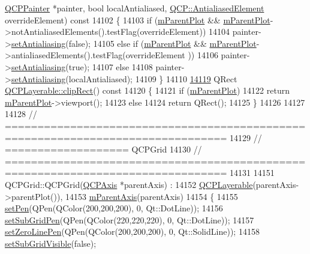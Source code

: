 \begin{DoxyCode}
      \hyperlink{a00047}{QCPPainter} *painter, \textcolor{keywordtype}{bool} localAntialiased, \hyperlink{a00143_ae55dbe315d41fe80f29ba88100843a0c}{QCP::AntialiasedElement} 
      overrideElement)\textcolor{keyword}{ const}
14102 \textcolor{keyword}{}\{
14103   \textcolor{keywordflow}{if} (\hyperlink{a00044_aa2a528433e44db02b8aef23c1f9f90ed}{mParentPlot} && \hyperlink{a00044_aa2a528433e44db02b8aef23c1f9f90ed}{mParentPlot}->notAntialiasedElements().testFlag(overrideElement))
14104     painter->\hyperlink{a00047_aaba1deb9188244d9ea65b035112b4d05}{setAntialiasing}(\textcolor{keyword}{false});
14105   \textcolor{keywordflow}{else} \textcolor{keywordflow}{if} (\hyperlink{a00044_aa2a528433e44db02b8aef23c1f9f90ed}{mParentPlot} && \hyperlink{a00044_aa2a528433e44db02b8aef23c1f9f90ed}{mParentPlot}->antialiasedElements().testFlag(overrideElement
      ))
14106     painter->\hyperlink{a00047_aaba1deb9188244d9ea65b035112b4d05}{setAntialiasing}(\textcolor{keyword}{true});
14107   \textcolor{keywordflow}{else}
14108     painter->\hyperlink{a00047_aaba1deb9188244d9ea65b035112b4d05}{setAntialiasing}(localAntialiased);
14109 \}
14110 
\hypertarget{a00115_source_l14119}{}\hyperlink{a00044_a07a8f746640c3704b09910df297afcba}{14119} QRect \hyperlink{a00044_a07a8f746640c3704b09910df297afcba}{QCPLayerable::clipRect}()\textcolor{keyword}{ const}
14120 \textcolor{keyword}{}\{
14121   \textcolor{keywordflow}{if} (\hyperlink{a00044_aa2a528433e44db02b8aef23c1f9f90ed}{mParentPlot})
14122     \textcolor{keywordflow}{return} \hyperlink{a00044_aa2a528433e44db02b8aef23c1f9f90ed}{mParentPlot}->viewport();
14123   \textcolor{keywordflow}{else}
14124     \textcolor{keywordflow}{return} QRect();
14125 \}
14126 
14127 
14128 \textcolor{comment}{// ================================================================================}
14129 \textcolor{comment}{// =================== QCPGrid}
14130 \textcolor{comment}{// ================================================================================}
14131 
14151 QCPGrid::QCPGrid(\hyperlink{a00025}{QCPAxis} *parentAxis) :
14152   \hyperlink{a00044}{QCPLayerable}(parentAxis->parentPlot()),
14153   \hyperlink{a00116_aea80007cf54320e192a69054cd81504b}{mParentAxis}(parentAxis)
14154 \{
14155   \hyperlink{a00116_a499165f4744b6d22da7b24295910fb2c}{setPen}(QPen(QColor(200,200,200), 0, Qt::DotLine));
14156   \hyperlink{a00116_a48c20da07dee569fc3acae82c9278fa7}{setSubGridPen}(QPen(QColor(220,220,220), 0, Qt::DotLine));
14157   \hyperlink{a00116_a03ce49d4768a12a2f05fa292880d10e4}{setZeroLinePen}(QPen(QColor(200,200,200), 0, Qt::SolidLine));
14158   \hyperlink{a00116_ad4ad6bf714ec45e08845456355a1b700}{setSubGridVisible}(\textcolor{keyword}{false});

\end{DoxyCode}
